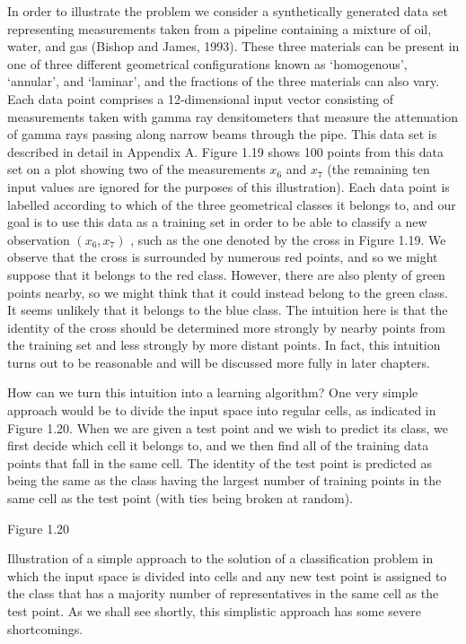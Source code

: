 \documentclass[
  10
]{article}
\begin{document}
In order to illustrate the problem we consider a synthetically generated
data set representing measurements taken from a pipeline containing a
mixture of oil, water, and gas (Bishop and James, 1993). These three
materials can be present in one of three different geometrical
configurations known as `homogenous', `annular', and `laminar', and the
fractions of the three materials can also vary. Each data point
comprises a 12-dimensional input vector consisting of measurements taken
with gamma ray densitometers that measure the attenuation of gamma rays
passing along narrow beams through the pipe. This data set is described
in detail in Appendix A. Figure 1.19 shows 100 points from this data set
on a plot showing two of the measurements \(x _ { 6 }\) and
\(x _ { 7 }\) (the remaining ten input values are ignored for the
purposes of this illustration). Each data point is labelled according to
which of the three geometrical classes it belongs to, and our goal is to
use this data as a training set in order to be able to classify a new
observation \(( x _ { 6 } , x _ { 7 } )\) , such as the one denoted by
the cross in Figure 1.19. We observe that the cross is surrounded by
numerous red points, and so we might suppose that it belongs to the red
class. However, there are also plenty of green points nearby, so we
might think that it could instead belong to the green class. It seems
unlikely that it belongs to the blue class. The intuition here is that
the identity of the cross should be determined more strongly by nearby
points from the training set and less strongly by more distant points.
In fact, this intuition turns out to be reasonable and will be discussed
more fully in later chapters.

How can we turn this intuition into a learning algorithm? One very
simple approach would be to divide the input space into regular cells,
as indicated in Figure 1.20. When we are given a test point and we wish
to predict its class, we first decide which cell it belongs to, and we
then find all of the training data points that fall in the same cell.
The identity of the test point is predicted as being the same as the
class having the largest number of training points in the same cell as
the test point (with ties being broken at random).

Figure 1.20

Illustration of a simple approach to the solution of a classification
problem in which the input space is divided into cells and any new test
point is assigned to the class that has a majority number of
representatives in the same cell as the test point. As we shall see
shortly, this simplistic approach has some severe shortcomings.
\end{document}
